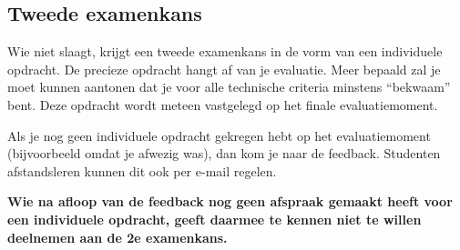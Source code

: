 \subsection{Tweede examenkans}
\label{subs:tweede-examenkans}

Wie niet slaagt, krijgt een tweede examenkans in de vorm van een individuele opdracht. De precieze opdracht hangt af van je evaluatie. Meer bepaald zal je moet kunnen aantonen dat je voor alle technische criteria minstens ``bekwaam'' bent. Deze opdracht wordt meteen vastgelegd op het finale evaluatiemoment.

Als je nog geen individuele opdracht gekregen hebt op het evaluatiemoment (bijvoorbeeld omdat je afwezig was), dan kom je naar de feedback. Studenten afstandsleren kunnen dit ook per e-mail regelen.

\textbf{Wie na afloop van de feedback nog geen afspraak gemaakt heeft voor een individuele opdracht, geeft daarmee te kennen niet te willen deelnemen aan de 2e examenkans.}